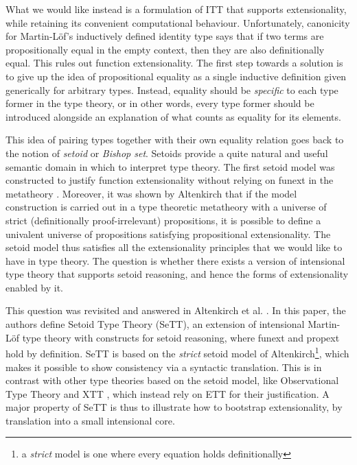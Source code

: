 \documentclass{easychair}
\begin{document}
What we would like instead is a formulation of ITT that supports extensionality,
while retaining its convenient computational behaviour.
%
Unfortunately, canonicity for Martin-L{\"o}f's inductively defined
identity type says that if two terms are propositionally equal in the
empty context, then they are also definitionally equal. This rules out
function extensionality.
%
The first step towards a solution is to give up the idea of propositional
equality as a single inductive definition given generically for arbitrary
types. Instead, equality should be \emph{specific} to each type former in the
type theory, or in other words, every type former should be introduced alongside
an explanation of what counts as equality for its elements.

This idea of pairing types together with their own equality relation goes back
to the notion of \emph{setoid} or \emph{Bishop set}. Setoids provide a quite
natural and useful semantic domain in which to interpret type theory. The first
setoid model was constructed to justify function extensionality without relying
on funext in the metatheory \cite{hofmann}. Moreover, it was shown by Altenkirch
\cite{setoid99} that if the model construction is carried out in a type
theoretic metatheory with a universe of strict (definitionally proof-irrelevant)
propositions, it is possible to define a univalent universe of propositions
satisfying propositional extensionality. The setoid model thus satisfies all the
extensionality principles that we would like to have in type theory. The
question is whether there exists a version of intensional type theory that
supports setoid reasoning, and hence the forms of extensionality enabled by it.

This question was revisited and answered in Altenkirch et al. \cite{mpc19}. In
this paper, the authors define Setoid Type Theory (SeTT), an extension of
intensional Martin-L\"of type theory with constructs for setoid reasoning, where
funext and propext hold by definition. SeTT is based on the \emph{strict} setoid
model of Altenkirch\footnote{a \emph{strict} model is one where every equation
  holds definitionally}, which makes it possible to show consistency via a
syntactic translation. This is in contrast with other type theories based on the
setoid model, like Observational Type Theory \cite{alti:ott-conf, alti:ott-conf}
and XTT \cite{xtt}, which instead rely on ETT for their justification. A major
property of SeTT is thus to illustrate how to bootstrap extensionality, by
translation into a small intensional core.
\end{document}
